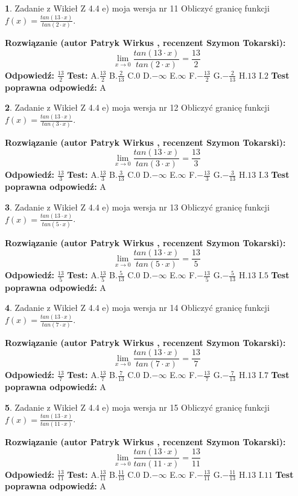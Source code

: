 \documentclass[12pt, a4paper]{article}
\theoremstyle{definition} %
\newtheorem{zad}{}
\newcommand{\zadStart}[1]{\begin{zad}#1\newline}
\newcommand{\zadStop}{\end{zad}}
\newcommand{\rozwStart}[2]{\noindent \textbf{Rozwiązanie (autor #1 , recenzent #2): }\newline}
\newcommand{\rozwStop}{\newline}
\newcommand{\odpStart}{\noindent \textbf{Odpowiedź:}\newline}
\newcommand{\odpStop}{\newline}
\newcommand{\testStart}{\noindent \textbf{Test:}\newline}
\newcommand{\testStop}{\newline}
\newcommand{\kluczStart}{\noindent \textbf{Test poprawna odpowiedź:}\newline}
\newcommand{\kluczStop}{\newline}
\begin{document}
\zadStart{Zadanie z Wikieł Z 4.4 e) moja wersja nr 11}
Obliczyć granicę funkcji $f(x)=\frac{tan(13\cdot x)}{tan(2\cdot x)}$.
\zadStop
\rozwStart{Patryk Wirkus}{Szymon Tokarski}
$$\lim\limits_{x\to 0}\frac{tan(13\cdot x)}{tan(2\cdot x)}=
\frac{13}{2}$$
\rozwStop
\odpStart
$\frac{13}{2}$
\odpStop
\testStart
A.$\frac{13}{2}$
B.$\frac{2}{13}$
C.$0$
D.$-\infty$
E.$\infty$
F.$-\frac{13}{2}$
G.$-\frac{2}{13}$
H.$13$
I.$2$
\testStop
\kluczStart
A
\kluczStop



\zadStart{Zadanie z Wikieł Z 4.4 e) moja wersja nr 12}
Obliczyć granicę funkcji $f(x)=\frac{tan(13\cdot x)}{tan(3\cdot x)}$.
\zadStop
\rozwStart{Patryk Wirkus}{Szymon Tokarski}
$$\lim\limits_{x\to 0}\frac{tan(13\cdot x)}{tan(3\cdot x)}=
\frac{13}{3}$$
\rozwStop
\odpStart
$\frac{13}{3}$
\odpStop
\testStart
A.$\frac{13}{3}$
B.$\frac{3}{13}$
C.$0$
D.$-\infty$
E.$\infty$
F.$-\frac{13}{3}$
G.$-\frac{3}{13}$
H.$13$
I.$3$
\testStop
\kluczStart
A
\kluczStop



\zadStart{Zadanie z Wikieł Z 4.4 e) moja wersja nr 13}
Obliczyć granicę funkcji $f(x)=\frac{tan(13\cdot x)}{tan(5\cdot x)}$.
\zadStop
\rozwStart{Patryk Wirkus}{Szymon Tokarski}
$$\lim\limits_{x\to 0}\frac{tan(13\cdot x)}{tan(5\cdot x)}=
\frac{13}{5}$$
\rozwStop
\odpStart
$\frac{13}{5}$
\odpStop
\testStart
A.$\frac{13}{5}$
B.$\frac{5}{13}$
C.$0$
D.$-\infty$
E.$\infty$
F.$-\frac{13}{5}$
G.$-\frac{5}{13}$
H.$13$
I.$5$
\testStop
\kluczStart
A
\kluczStop



\zadStart{Zadanie z Wikieł Z 4.4 e) moja wersja nr 14}
Obliczyć granicę funkcji $f(x)=\frac{tan(13\cdot x)}{tan(7\cdot x)}$.
\zadStop
\rozwStart{Patryk Wirkus}{Szymon Tokarski}
$$\lim\limits_{x\to 0}\frac{tan(13\cdot x)}{tan(7\cdot x)}=
\frac{13}{7}$$
\rozwStop
\odpStart
$\frac{13}{7}$
\odpStop
\testStart
A.$\frac{13}{7}$
B.$\frac{7}{13}$
C.$0$
D.$-\infty$
E.$\infty$
F.$-\frac{13}{7}$
G.$-\frac{7}{13}$
H.$13$
I.$7$
\testStop
\kluczStart
A
\kluczStop



\zadStart{Zadanie z Wikieł Z 4.4 e) moja wersja nr 15}
Obliczyć granicę funkcji $f(x)=\frac{tan(13\cdot x)}{tan(11\cdot x)}$.
\zadStop
\rozwStart{Patryk Wirkus}{Szymon Tokarski}
$$\lim\limits_{x\to 0}\frac{tan(13\cdot x)}{tan(11\cdot x)}=
\frac{13}{11}$$
\rozwStop
\odpStart
$\frac{13}{11}$
\odpStop
\testStart
A.$\frac{13}{11}$
B.$\frac{11}{13}$
C.$0$
D.$-\infty$
E.$\infty$
F.$-\frac{13}{11}$
G.$-\frac{11}{13}$
H.$13$
I.$11$
\testStop
\kluczStart
A
\kluczStop
\end{document}
